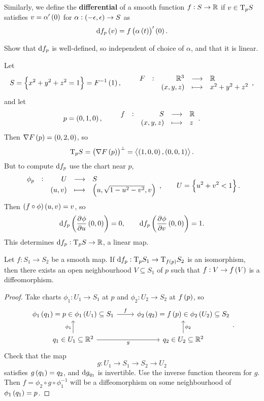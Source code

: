 Similarly, we define the \textbf{differential} of a smooth function $ f : S \to \mathbb{R} $ if $ v \in \mathrm{T}_p S $ satisfies $ v = \alpha'\br{0} $ for $ \alpha : \br{-\epsilon, \epsilon} \to S $ as
$$ \d f_p\br{v} = f\br{\alpha\br{t}}'\br{0}. $$

\begin{exercise*}
Show that $ \mathrm{d} f_p $ is well-defined, so independent of choice of $ \alpha $, and that it is linear.
\end{exercise*}


\begin{example*}
Let
$$ S = \cbr{x^2 + y^2 + z^2 = 1} = F^{-1}\br{1}, \qquad \function[F]{\RR^3}{\RR}{\br{x, y, z}}{x^2 + y^2 + z^2}, $$
and let
$$ p = \br{0, 1, 0}, \qquad \function[f]{S}{\RR}{\br{x, y, z}}{z}. $$
Then $ \nabla F\br{p} = \br{0, 2, 0} $, so
$$ \T_p S = \br{\nabla F\br{p}}^\perp = \abr{\br{1, 0, 0}, \br{0, 0, 1}}. $$
But to compute $ \mathrm{d} f_p $ use the chart near $ p $,
$$ \function[\phi_p]{U}{S}{\br{u, v}}{\br{u, \sqrt{1 - u^2 - v^2}, v}}, \qquad U = \cbr{u^2 + v^2 < 1}. $$
Then $ \br{f \circ \phi}\br{u, v} = v $, so
$$ \d f_p\br{\dpd{\phi}{u}\br{0, 0}} = 0, \qquad \d f_p\br{\dpd{\phi}{v}\br{0, 0}} = 1. $$
This determines $ \mathrm{d} f_p : \mathrm{T}_p S \to \mathbb{R} $, a linear map.
\end{example*}

\begin{proposition}
Let $ f : S_1 \to S_2 $ be a smooth map. If $ \d f_p : \T_p S_1 \to \T_{f\br{p}} S_2 $ is an isomorphism, then there exists an open neighbourhood $ V \subseteq S_1 $ of $ p $ such that $ f : V \to f\br{V} $ is a diffeomorphism.
\end{proposition}

\begin{proof}
Take charts $ \phi_1 : U_1 \to S_1 $ at $ p $ and $ \phi_2 : U_2 \to S_2 $ at $ f\br{p} $, so
$$
\begin{tikzcd}
\phi_1\br{q_1} = p \in \phi_1\br{U_1} \subseteq S_1 \arrow{r}{f} & \phi_2\br{q_2} = f\br{p} \in \phi_2\br{U_2} \subseteq S_2 \\
q_1 \in U_1 \subseteq \RR^2 \arrow{u}{\phi_1} \arrow{r}[swap]{g} & q_2 \in U_2 \subseteq \RR^2 \arrow{u}[swap]{\phi_2}
\end{tikzcd}.
$$
Check that the map
$$ g : U_1 \to S_1 \to S_2 \to U_2 $$
satisfies $ g\br{q_1} = q_2 $, and $ \mathrm{d} g_{q_1} $ is invertible. Use the inverse function theorem for $ g $. Then $ f = \phi_2 \circ g \circ \phi_1^{-1} $ will be a diffeomorphism on some neighbourhood of $ \phi_1\br{q_1} = p $.
\end{proof}

